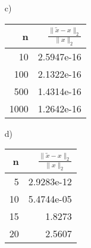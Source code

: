 \documentclass{mywork}
\begin{document}
\begin{aufgabe}
	\begin{enumerate}
		\item[c)]
			\begin{tabular}{r|r}
				n & $\frac{\|\tilde x-x\|_2}{\|x\|_2}$\\
				\hline
				10 & 2.5947e-16\\
			   100 & 2.1322e-16\\
				   500& 1.4314e-16\\
				  1000& 1.2642e-16
			\end{tabular}
		\item[d)]
			\begin{tabular}{r|r}
				n & $\frac{\|\tilde x-x\|_2}{\|x\|_2}$\\
				\hline
				5 & 2.9283e-12\\
				10& 5.4744e-05\\
				15& 1.8273\\
				20& 2.5607
			\end{tabular}
	\end{enumerate}

\end{aufgabe}
\end{document}
